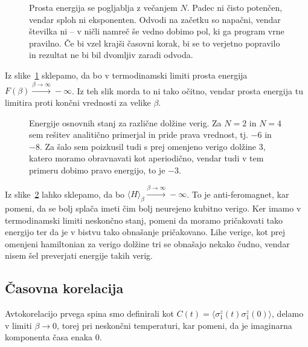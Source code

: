 \documentclass[a4 paper, 12pt]{article}
\begin{document}
\begin{figure}[H]
   \begin{center}
      
   \end{center}
   \vspace{-20pt}
   \caption{Prosta energija se pogljablja z večanjem $N$. Padec ni čisto potenčen, vendar sploh ni eksponenten.
	Odvodi na začetku so napačni, vendar številka ni -- v ničli namreč še vedno dobimo pol, ki ga program vrne
	pravilno. Če bi vzel krajši časovni korak, bi se to verjetno popravilo in rezultat ne bi bil dvomljiv
	zaradi odvoda.}
   \label{fig:pic1}
   \vspace{-10pt}
\end{figure}

Iz slike~\ref{fig:pic1} sklepamo, da bo v termodinamski limiti prosta energija
$F(\beta) \stackrel{\beta\to\infty}\longrightarrow - \infty$. Iz teh slik morda
to ni tako očitno, vendar prosta energija tu limitira proti končni vrednosti
za velike $\beta$.

\begin{figure}[H]
   \begin{center}
      
   \end{center}
   \vspace{-20pt}
   \caption{Energije osnovnih stanj za različne dolžine verig. Za $N = 2$ in $N = 4$ sem rešitev analitično primerjal
	in pride prava vrednost, tj. $-6$ in $-8$. Za šalo sem poizkusil tudi s prej omenjeno verigo dolžine 3, katero
	moramo obravnavati kot aperiodično, vendar tudi v tem primeru dobimo pravo energijo, to je $-3$.}
   \label{fig:pic2}
\end{figure}

Iz slike~\ref{fig:pic2} lahko sklepamo, da bo
$\langle H\rangle_\beta \stackrel{\beta\to\infty}{\longrightarrow} -\infty$. To
je anti-feromagnet, kar pomeni, da se bolj splača imeti čim bolj neurejeno
kubitno verigo. Ker imamo v termodinamski limiti neskončno stanj, pomeni da
moramo pričakovati tako energijo ter da je v bistvu tako obnašanje pričakovano.
Lihe verige, kot prej omenjeni hamiltonian za verigo dolžine tri se obnašajo
nekako čudno, vendar nisem šel preverjati energije takih verig.

\pagebreak

\subsection{Časovna korelacija}

Avtokorelacijo prvega spina smo definirali kot $C(t) = \langle \sigma^z_1(t) \sigma^z_1 (0) \rangle$, delamo v limiti
$\beta \to 0$, torej pri neskončni temperaturi, kar pomeni, da je imaginarna komponenta časa enaka 0.
\end{document}
